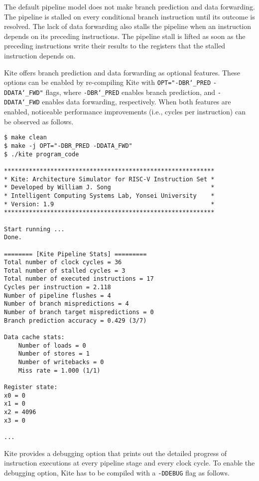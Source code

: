\documentclass[10pt]{article}
\begin{document}
The default pipeline model does not make branch prediction and data forwarding.
The pipeline is stalled on every conditional branch instruction until its outcome is resolved.
The lack of data forwarding also stalls the pipeline when an instruction depends on its preceding instructions.
The pipeline stall is lifted as soon as the preceding instructions write their results to the registers that the stalled instruction depends on.

Kite offers branch prediction and data forwarding as optional features.
These options can be enabled by re-compiling Kite with {\tt OPT="-DBR\char`_PRED} {\tt -DDATA\char`_FWD"} flags, where {\tt -DBR\char`_PRED} enables branch prediction, and {\tt -DDATA\char`_FWD} enables data forwarding, respectively.
When both features are enabled, noticeable performance improvements (i.e., cycles per instruction) can be observed as follows.

\begin{Verbatim}[frame=single]
$ make clean
$ make -j OPT="-DBR_PRED -DDATA_FWD"
$ ./kite program_code

***********************************************************
* Kite: Architecture Simulator for RISC-V Instruction Set *
* Developed by William J. Song                            *
* Intelligent Computing Systems Lab, Yonsei University    *
* Version: 1.9                                            *
***********************************************************

Start running ...
Done.

======== [Kite Pipeline Stats] =========
Total number of clock cycles = 36
Total number of stalled cycles = 3
Total number of executed instructions = 17
Cycles per instruction = 2.118
Number of pipeline flushes = 4
Number of branch mispredictions = 4
Number of branch target mispredictions = 0
Branch prediction accuracy = 0.429 (3/7)

Data cache stats:
    Number of loads = 0
    Number of stores = 1
    Number of writebacks = 0
    Miss rate = 1.000 (1/1)

Register state:
x0 = 0
x1 = 0
x2 = 4096
x3 = 0

...

\end{Verbatim}

Kite provides a debugging option that prints out the detailed progress of instruction executions at every pipeline stage and every clock cycle.
To enable the debugging option, Kite has to be compiled with a {\tt -DDEBUG} flag as follows.
\end{document}
